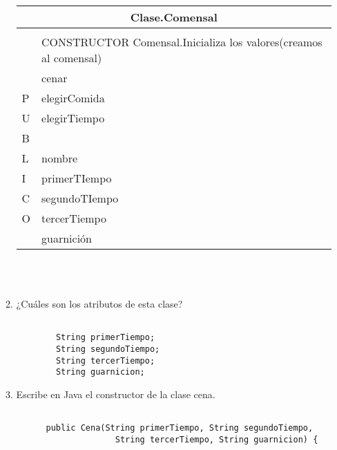 \documentclass[a4paper,10pt]{article}
\begin{document}
\begin{enumerate}
\begin{enumerate}
      \begin{tabular}{ |l|l| }
        \hline
        \multicolumn{2}{|c|}{Clase.Comensal} \\
        \hline
         & \\
         &  CONSTRUCTOR Comensal.Inicializa los valores(creamos al comensal) \\
         & cenar\hspace{3.3cm}{El comensal accede a la comida} \\
        P & elegirComida \hspace{2cm}{El comensal elige la comida de cada tiempo}\\
        U  & elegirTiempo \hspace{2cm}{El comensal elige en que tiempo desea comenzar a cenar}\\
        B  &  \\
        \hline
        L &  nombre \hspace{3.6cm}{Almacena el nombre del comensal}\\
        I &   primerTIempo \hspace{2.5cm}{Almacena la comida del primer tiempo} \\  
        C &   segundoTIempo \hspace{2.3cm}{Almacena la comida del segundo tiempo} \\
        O &   tercerTiempo \hspace{2.7cm}{Almacena la comida del tercer tiempo} \\     
         &   guarnición \hspace{3.2cm}{Almacena la guarnicion del tercer tiempo}   \\   
        \hline
      \end{tabular}\\\\


      \item ¿Cuáles son los atributos de esta clase?
      \begin{lstlisting}

        String primerTiempo;
        String segundoTiempo;
        String tercerTiempo;
        String guarnicion;       
               \end{lstlisting}

       \item Escribe en Java el constructor de la clase cena.
       \begin{lstlisting}
        
      public Cena(String primerTiempo, String segundoTiempo, 
                    String tercerTiempo, String guarnicion) {


\end{lstlisting}
\end{enumerate}
\end{enumerate}
\end{document}
